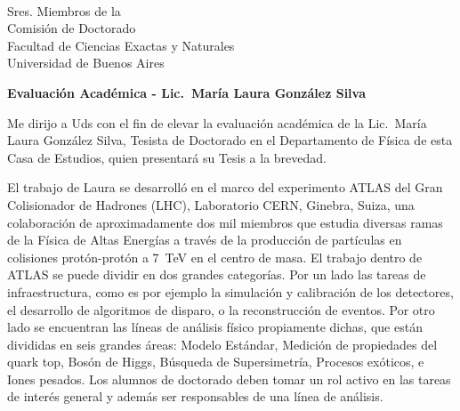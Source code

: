 \setlength{\textheight}{220mm}
\setlength{\topmargin}{15mm}
\setlength{\headheight}{0cm}
\setlength{\headsep}{0cm}
\setlength{\textwidth}{160mm}


\date{Noviembre 13, 2012}

 
\newcommand{\kt}{k$_\perp$\ }
\def\D0{D\O}
\def \GeV {\rm GeV}
\def\etal{{\sl et al.}}


\begin{letter}{\ }
 
\vspace{-6cm}
\opening{Sres. Miembros de la \\
        Comisi\'on de Doctorado \\
        Facultad de Ciencias Exactas y Naturales \\
        Universidad de Buenos Aires}

\vspace{5mm}

{\large \bf Evaluaci\'on Acad\'emica - Lic.\ Mar\'ia Laura Gonz\'alez Silva }

\vspace{5mm}

Me dirijo a Uds con el fin de elevar la evaluaci\'on acad\'emica de la Lic.\
Mar\'ia Laura Gonz\'alez Silva, Tesista de Doctorado en el Departamento de
F\'isica de esta Casa de Estudios, quien presentar\'a su Tesis a la brevedad.

El trabajo de Laura se desarroll\'o en el marco del experimento ATLAS del Gran
Colisionador de Hadrones (LHC), Laboratorio CERN, Ginebra, Suiza, una
colaboraci\'on de aproximadamente dos mil miembros que estudia diversas ramas
de la F\'isica de Altas Energ\'ias a trav\'es de la producci\'on de
part\'iculas en colisiones prot\'on-prot\'on a 7~TeV en el centro de masa. El
trabajo dentro de ATLAS se puede dividir en dos grandes categor\'ias. Por un
lado las tareas de infraestructura, como es por ejemplo la simulaci\'on y
calibraci\'on de los detectores, el desarrollo de algoritmos de disparo, o la
reconstrucci\'on de eventos.  Por otro lado se encuentran las l\'ineas de
an\'alisis f\'isico propiamente dichas, que est\'an divididas en seis grandes
\'areas: Modelo Est\'andar, Medici\'on de propiedades del quark top, Bos\'on de
Higgs, B\'usqueda de Supersimetr\'ia, Procesos ex\'oticos, e Iones pesados. Los
alumnos de doctorado deben tomar un rol activo en las tareas de inter\'es
general y adem\'as ser responsables de una l\'inea de an\'alisis.


\end{letter}

